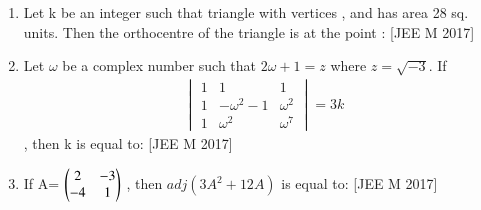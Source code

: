 \documentclass[journal,,12pt,twocolumn]{IEEEtran}
\theoremstyle{remark}
\begin{document}
\begin{enumerate}
    \item Let k be an integer such that triangle with vertices ,  and  has area 28 sq. units. Then the orthocentre of the triangle is at the point :
    \hfill{[JEE M 2017]}
    \begin{enumerate}
    \end{enumerate}
    \item Let $\omega$ be a complex number such that $2\omega + 1=z$ where $z=\sqrt{-3}$. If \begin{align*}\begin{vmatrix}
1 & 1  & 1 \\
1 & -\omega^2-1 & \omega^2 \\
1 & \omega^2 & \omega^7 
\end{vmatrix}=3k \end{align*}, then k is equal to:
\hfill{[JEE M 2017]}
\begin{enumerate}
\end{enumerate}
\item If A= $\begin{pmatrix}
    2 & -3 \\
    -4 & 1
\end{pmatrix}$
    , then $adj(3A^2+12A)$ is equal to:
\hfill{[JEE M 2017]}
\begin{enumerate}
\end{enumerate}
\end{enumerate}
\end{document}
